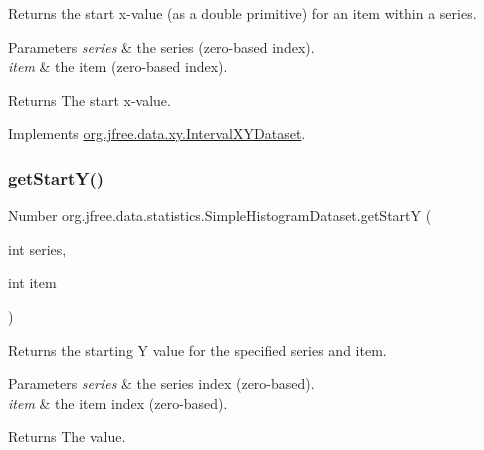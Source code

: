 Returns the start x-\/value (as a double primitive) for an item within a series.


\begin{DoxyParams}{Parameters}
{\em series} & the series (zero-\/based index). \\
\hline
{\em item} & the item (zero-\/based index).\\
\hline
\end{DoxyParams}
\begin{DoxyReturn}{Returns}
The start x-\/value. 
\end{DoxyReturn}


Implements \mbox{\hyperlink{interfaceorg_1_1jfree_1_1data_1_1xy_1_1_interval_x_y_dataset_a437afe7f637a8d16ad305023a7819eef}{org.\+jfree.\+data.\+xy.\+Interval\+X\+Y\+Dataset}}.

\mbox{\label{classorg_1_1jfree_1_1data_1_1statistics_1_1_simple_histogram_dataset_a3cea8376e1afeb2064fc3a36b72d8c4b}} 
\subsubsection{\texorpdfstring{get\+Start\+Y()}{getStartY()}}
{\footnotesize\ttfamily Number org.\+jfree.\+data.\+statistics.\+Simple\+Histogram\+Dataset.\+get\+StartY (\begin{DoxyParamCaption}\item[{int}]{series,  }\item[{int}]{item }\end{DoxyParamCaption})}

Returns the starting Y value for the specified series and item.


\begin{DoxyParams}{Parameters}
{\em series} & the series index (zero-\/based). \\
\hline
{\em item} & the item index (zero-\/based).\\
\hline
\end{DoxyParams}
\begin{DoxyReturn}{Returns}
The value. 
\end{DoxyReturn}


